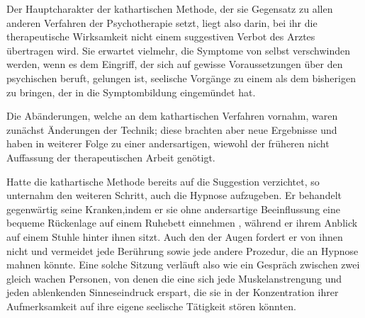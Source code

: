 \documentclass[twoside=true,titlepage=false,open=any, parskip=never, fontsize=10pt, headings=small, chapterprefix=false, appendixprefix=false]{scrbook}
\begin{document}
            
        \pstart
        Der Hauptcharakter der kathartischen Methode, der sie  Gegensatz zu allen anderen Verfahren der Psychotherapie setzt, liegt
               also darin,  bei ihr die therapeutische Wirksamkeit nicht einem suggestiven Verbot des
               Arztes übertragen wird. Sie erwartet vielmehr,  die Symptome von selbst verschwinden werden, wenn es dem Eingriff, der
               sich auf gewisse Voraussetzungen über den psychischen  beruft, gelungen ist, seelische Vorgänge zu einem  als dem bisherigen  zu bringen, der in die Symptombildung eingemündet hat.
        \pend
    
            
        \pstart
        Die Abänderungen, welche  an dem kathartischen
                  Verfahren  vornahm, waren zunächst Änderungen der Technik; diese brachten
               aber neue Ergebnisse und haben in weiterer Folge zu einer andersartigen, wiewohl
               der früheren nicht  Auffassung der therapeutischen Arbeit genötigt.
        \pend
    
            
        \pstart
        Hatte die kathartische Methode bereits auf die Suggestion verzichtet, so unternahm  den weiteren Schritt, auch die Hypnose aufzugeben. Er behandelt
                  gegenwärtig seine Kranken,indem er sie ohne andersartige Beeinflussung eine bequeme Rückenlage auf
               einem Ruhebett einnehmen , während er
                ihrem Anblick  auf einem Stuhle hinter ihnen sitzt. Auch den  der Augen fordert er von ihnen nicht und vermeidet jede Berührung sowie
               jede andere Prozedur, die an Hypnose mahnen könnte. Eine solche Sitzung verläuft
               also wie ein Gespräch zwischen zwei gleich wachen Personen, von denen die
               eine sich jede Muskelanstrengung und jeden ablenkenden Sinneseindruck
               erspart, die sie in der Konzentration ihrer Aufmerksamkeit auf ihre eigene
               seelische Tätigkeit stören könnten.
        \pend
    
\end{document}
